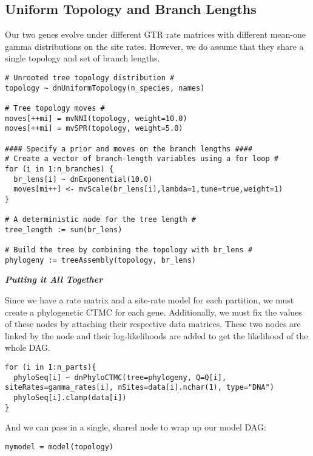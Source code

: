 \subsection{Uniform Topology and Branch Lengths}

Our two genes evolve under different GTR rate matrices with different mean-one gamma distributions on the site rates.
However, we do assume that they share a single topology and set of branch lengths.
{\tt \begin{snugshade*}
\begin{lstlisting}
# Unrooted tree topology distribution #
topology ~ dnUniformTopology(n_species, names)

# Tree topology moves #
moves[++mi] = mvNNI(topology, weight=10.0)
moves[++mi] = mvSPR(topology, weight=5.0)

#### Specify a prior and moves on the branch lengths #### 
# Create a vector of branch-length variables using a for loop #
for (i in 1:n_branches) {
  br_lens[i] ~ dnExponential(10.0)
  moves[mi++] <- mvScale(br_lens[i],lambda=1,tune=true,weight=1) 
}

# A deterministic node for the tree length #
tree_length := sum(br_lens)

# Build the tree by combining the topology with br_lens #
phylogeny := treeAssembly(topology, br_lens)
\end{lstlisting}
\end{snugshade*}}

\textbf{\textit{Putting it All Together}}

Since we have a rate matrix and a site-rate model for each partition, we must create a phylogenetic CTMC for each gene. 
Additionally, we must fix the values of these nodes by attaching their respective data matrices.
These two nodes are linked by the  node and their log-likelihoods are added to get the likelihood of the whole DAG.
{\tt \begin{snugshade*}
\begin{lstlisting}
for (i in 1:n_parts){
  phyloSeq[i] ~ dnPhyloCTMC(tree=phylogeny, Q=Q[i], siteRates=gamma_rates[i], nSites=data[i].nchar(1), type="DNA")
  phyloSeq[i].clamp(data[i])
}
\end{lstlisting}
\end{snugshade*}}


And we can pass in a single, shared node to wrap up our model DAG:
{\tt \begin{snugshade*}
\begin{lstlisting}
mymodel = model(topology)
\end{lstlisting}
\end{snugshade*}}




